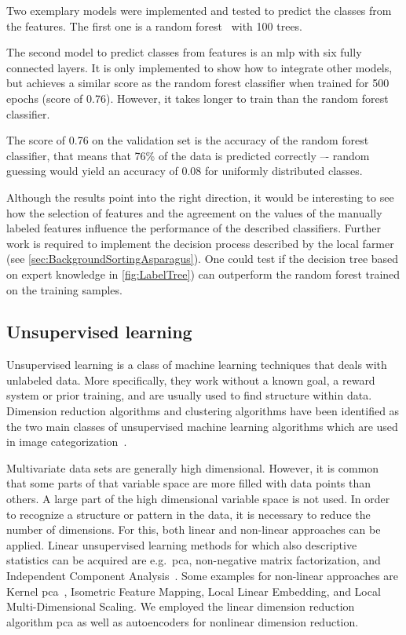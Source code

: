 \bigskip
Two exemplary models were implemented and tested to predict the classes from the features. The first one is a random forest~\citep{breiman2001random} with 100 trees.

The second model to predict classes from features is an \acrshort{mlp} with six fully connected layers. It is only implemented to show how to integrate other models, but achieves a similar score as the random forest classifier when trained for 500 epochs (score of 0.76). However, it takes longer to train than the random forest classifier.

The score of 0.76 on the validation set is the accuracy of the random forest classifier, that means that 76\% of the data is predicted correctly –- random guessing would yield an accuracy of 0.08 for uniformly distributed classes.

\bigskip
Although the results point into the right direction, it would be interesting to see how the selection of features and the agreement on the values of the manually labeled features influence the performance of the described classifiers. Further work is required to implement the decision process described by the local farmer (see \autoref{sec:BackgroundSortingAsparagus}). One could test if the decision tree based on expert knowledge in \autoref{fig:LabelTree}) can outperform the random forest trained on the training samples.


\subsection{Unsupervised learning}
\label{sec:UnsupervisedLearning}

Unsupervised learning is a class of machine learning techniques that deals with unlabeled data. More specifically, they work without a known goal, a reward system or prior training, and are usually used to find structure within data. Dimension reduction algorithms and clustering algorithms have been identified as the two main classes of unsupervised machine learning algorithms which are used in image categorization~\citep{olaode2014}. 

\bigskip
Multivariate data sets are generally high dimensional. However, it is common that some parts of that variable space are more filled with data points than others. A large part of the high dimensional variable space is not used. In order to recognize a structure or pattern in the data, it is necessary to reduce the number of dimensions. For this, both linear and non-linear approaches can be applied. Linear unsupervised learning methods for which also descriptive statistics can be acquired are e.g.\ \acrfull{pca}, non-negative matrix factorization, and Independent Component Analysis~\citep{olaode2014}. Some examples for non-linear approaches are Kernel \acrshort{pca}~\citep{olivier2006semi}, Isometric Feature Mapping,  Local Linear Embedding, and Local Multi-Dimensional Scaling. We employed the linear dimension reduction algorithm \acrshort{pca} as well as autoencoders for nonlinear dimension reduction.


